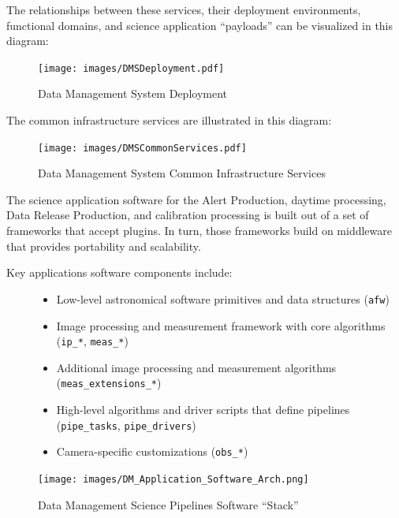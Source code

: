 \documentclass[]{article}
\providecommand{\tightlist}{%
  \setlength{\itemsep}{0pt}\setlength{\parskip}{0pt}}
\begin{document}
The relationships between these services, their deployment environments,
functional domains, and science application ``payloads'' can be
visualized in this diagram:

\begin{figure}
\centering
\texttt{[image: images/DMSDeployment.pdf]}
\caption{Data Management System Deployment}
\end{figure}

The common infrastructure services are illustrated in this diagram:

\begin{figure}
\centering
\texttt{[image: images/DMSCommonServices.pdf]}
\caption{Data Management System Common Infrastructure Services}
\end{figure}

The science application software for the Alert Production, daytime
processing, Data Release Production, and calibration processing is built
out of a set of frameworks that accept plugins. In turn, those
frameworks build on middleware that provides portability and
scalability.

\begin{description}
\item[Key applications software components include:]
\begin{itemize}
\tightlist
\item
  Low-level astronomical software primitives and data structures
  (\texttt{afw})
\item
  Image processing and measurement framework with core algorithms
  (\texttt{ip\_*}, \texttt{meas\_*})
\item
  Additional image processing and measurement algorithms
  (\texttt{meas\_extensions\_*})
\item
  High-level algorithms and driver scripts that define pipelines
  (\texttt{pipe\_tasks}, \texttt{pipe\_drivers})
\item
  Camera-specific customizations (\texttt{obs\_*})
\end{itemize}
\end{description}

\begin{figure}
\centering
\texttt{[image: images/DM\_Application\_Software\_Arch.png]}
\caption{Data Management Science Pipelines Software ``Stack''}
\end{figure}
\end{document}
